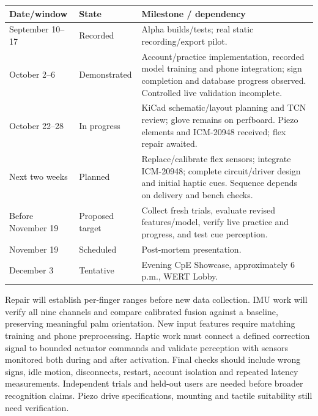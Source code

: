\documentclass[11pt,letterpaper]{article}
\begin{document}
\par\Needspace{3.5in}
\begin{center}
\small
\begin{tabularx}{\linewidth}{@{}P{3.1cm}P{2.4cm}Y@{}}
\toprule
\textbf{Date/window} & \textbf{State} & \textbf{Milestone / dependency}\\
\midrule
September 10--17 & Recorded & Alpha builds/tests; real static recording/export pilot.\\
October 2--6 & Demonstrated & Account/practice implementation, recorded model training and phone integration; sign completion and database progress observed. Controlled live validation incomplete.\\
October 22--28 & In progress & KiCad schematic/layout planning and TCN review; glove remains on perfboard. Piezo elements and ICM-20948 received; flex repair awaited.\\
Next two weeks & Planned & Replace/calibrate flex sensors; integrate ICM-20948; complete circuit/driver design and initial haptic cues. Sequence depends on delivery and bench checks.\\
Before November 19 & Proposed target & Collect fresh trials, evaluate revised features/model, verify live practice and progress, and test cue perception.\\
November 19 & Scheduled & Post-mortem presentation.\\
December 3 & Tentative & Evening CpE Showcase, approximately 6 p.m., WERT Lobby.\\
\bottomrule
\end{tabularx}
\captionsetup{hypcap=false}
\label{tab:timeline}
\end{center}

Repair will establish per-finger ranges before new data collection. IMU work
will verify all nine channels and compare calibrated fusion against a baseline,
preserving meaningful palm orientation. New input features require matching
training and phone preprocessing. Haptic work must connect a defined correction
signal to bounded actuator commands and validate perception with sensors
monitored both during and after activation. Final checks should include wrong
signs, idle motion, disconnects, restart, account isolation and repeated latency
measurements. Independent trials and held-out users are needed before broader
recognition claims. Piezo drive specifications, mounting and tactile suitability
still need verification.
\end{document}
